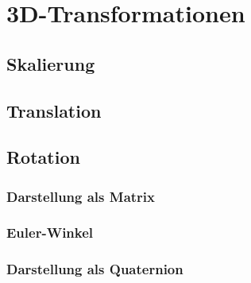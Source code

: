 \chapter{3D-Transformationen}
\label{transformation}

\section{Skalierung}

\section{Translation}

\section{Rotation}
\subsection{Darstellung als Matrix}
\subsection{Euler-Winkel}
\subsection{Darstellung als Quaternion}